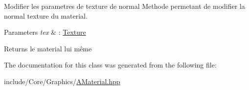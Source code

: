 Modifier les parametres de texture de normal Methode permetant de modifier la normal texture du material. 


\begin{DoxyParams}{Parameters}
{\em tex} & \+: \mbox{\hyperlink{class_beer_engine_1_1_graphics_1_1_texture}{Texture}} \\
\hline
\end{DoxyParams}
\begin{DoxyReturn}{Returns}
le material lui même 
\end{DoxyReturn}


The documentation for this class was generated from the following file\+:\begin{DoxyCompactItemize}
\item 
include/\+Core/\+Graphics/\mbox{\hyperlink{_a_material_8hpp}{A\+Material.\+hpp}}\end{DoxyCompactItemize}
